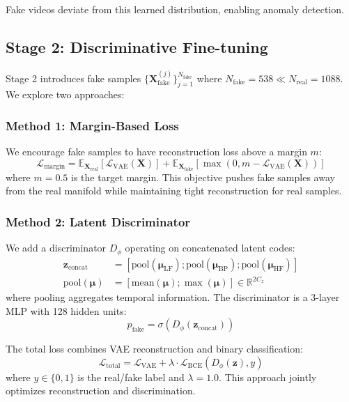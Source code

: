 \documentclass{article}
\begin{document}
Fake videos deviate from this learned distribution, enabling anomaly detection.

\subsection{Stage 2: Discriminative Fine-tuning}

Stage 2 introduces fake samples $\{\mathbf{X}^{(j)}_{\text{fake}}\}_{j=1}^{N_{\text{fake}}}$ where $N_{\text{fake}} = 538 \ll N_{\text{real}} = 1088$. We explore two approaches:

\subsubsection{Method 1: Margin-Based Loss}

We encourage fake samples to have reconstruction loss above a margin $m$:
\begin{equation}
\mathcal{L}_{\text{margin}} = \mathbb{E}_{\mathbf{X}_{\text{real}}}[\mathcal{L}_{\text{VAE}}(\mathbf{X})] + \mathbb{E}_{\mathbf{X}_{\text{fake}}}[\max(0, m - \mathcal{L}_{\text{VAE}}(\mathbf{X}))]
\end{equation}
where $m=0.5$ is the target margin. This objective pushes fake samples away from the real manifold while maintaining tight reconstruction for real samples.

\subsubsection{Method 2: Latent Discriminator}

We add a discriminator $D_\phi$ operating on concatenated latent codes:
\begin{align}
    \mathbf{z}_{\text{concat}} &= [\text{pool}(\boldsymbol{\mu}_{\text{LF}}); \text{pool}(\boldsymbol{\mu}_{\text{BP}}); \text{pool}(\boldsymbol{\mu}_{\text{HF}})] \\
    \text{pool}(\boldsymbol{\mu}) &= [\text{mean}(\boldsymbol{\mu}); \max(\boldsymbol{\mu})] \in \mathbb{R}^{2C_z}
\end{align}
where pooling aggregates temporal information. The discriminator is a 3-layer MLP with 128 hidden units:
\begin{equation}
    p_{\text{fake}} = \sigma(D_\phi(\mathbf{z}_{\text{concat}}))
\end{equation}

The total loss combines VAE reconstruction and binary classification:
\begin{equation}
\mathcal{L}_{\text{total}} = \mathcal{L}_{\text{VAE}} + \lambda \cdot \mathcal{L}_{\text{BCE}}(D_\phi(\mathbf{z}), y)
\end{equation}
where $y \in \{0, 1\}$ is the real/fake label and $\lambda=1.0$. This approach jointly optimizes reconstruction and discrimination.
\end{document}
